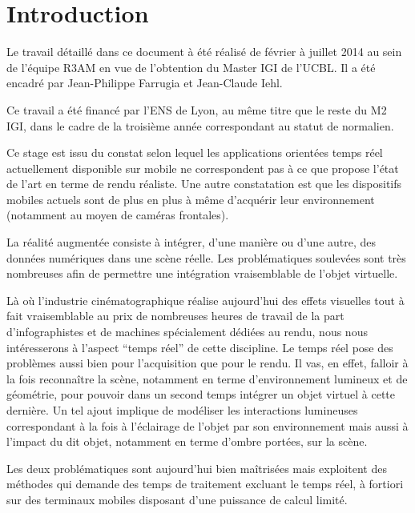 \documentclass[10pt,a4paper,twoside, twocolumn]{report}
\begin{document}
\chapter{Introduction}

Le travail détaillé dans ce document à été réalisé de février à juillet 2014 au sein de l'équipe R3AM en vue de l’obtention du Master IGI de l'UCBL. Il a été encadré par Jean-Philippe Farrugia et Jean-Claude Iehl.

Ce travail a été financé par l'ENS de Lyon, au même titre que le reste du M2 IGI, dans le cadre de la troisième année correspondant au statut de normalien.

Ce stage est issu du constat selon lequel les applications orientées temps réel actuellement disponible sur mobile ne correspondent pas à ce que propose l'état de l'art en terme de rendu réaliste. Une autre constatation est que les dispositifs mobiles actuels sont de plus en plus à même d’acquérir leur environnement (notamment au moyen de caméras frontales). 

La réalité augmentée consiste à intégrer, d'une manière ou d'une autre, des données numériques dans une scène réelle. Les problématiques soulevées sont très nombreuses afin de permettre une intégration vraisemblable de l'objet virtuelle.

Là où l'industrie cinématographique réalise aujourd'hui des effets visuelles tout à fait vraisemblable au prix de nombreuses heures de travail de la part d'infographistes et de machines spécialement dédiées au rendu, nous nous intéresserons à l'aspect “temps réel” de cette discipline. Le temps réel pose des problèmes aussi bien pour l'acquisition que pour le rendu. Il vas, en effet, falloir à la fois reconnaître la scène, notamment en terme d'environnement lumineux et de géométrie, pour pouvoir dans un second temps intégrer un objet virtuel à cette dernière. Un tel ajout implique de modéliser les interactions lumineuses correspondant à la fois à l'éclairage de l'objet par son environnement mais aussi à l'impact du dit objet, notamment en terme d'ombre portées, sur la scène.

Les deux problématiques sont aujourd'hui bien maîtrisées mais exploitent des méthodes qui demande des temps de traitement excluant le temps réel, à fortiori sur des terminaux mobiles disposant d'une puissance de calcul limité.
\end{document}

